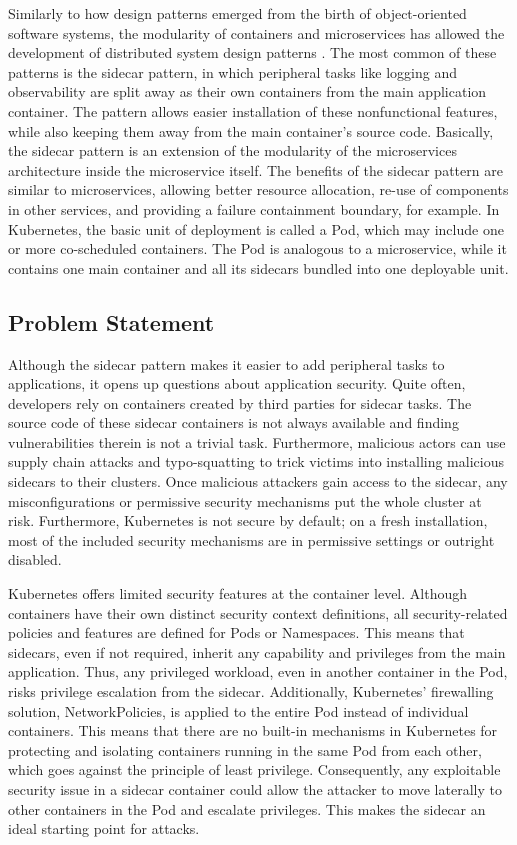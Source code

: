 \documentclass[english, 12pt, a4paper, sci, utf8, a-2b, online]{aaltothesis}
\begin{document}
Similarly to how design patterns emerged from the birth of object-oriented software systems, the modularity of containers and microservices has allowed the development of distributed system design patterns \cite{burns2016design}.
The most common of these patterns is the sidecar pattern, in which peripheral tasks like logging and observability are split away as their own containers from the main application container.
The pattern allows easier installation of these nonfunctional features, while also keeping them away from the main container's source code.
Basically, the sidecar pattern is an extension of the modularity of the microservices architecture inside the microservice itself.
The benefits of the sidecar pattern are similar to microservices, allowing better resource allocation, re-use of components in other services, and providing a failure containment boundary, for example.
In Kubernetes, the basic unit of deployment is called a Pod, which may include one or more co-scheduled containers.
The Pod is analogous to a microservice, while it contains one main container and all its sidecars bundled into one deployable unit.

\subsection{Problem Statement}

Although the sidecar pattern makes it easier to add peripheral tasks to applications, it opens up questions about application security.
Quite often, developers rely on containers created by third parties for sidecar tasks.
The source code of these sidecar containers is not always available and finding vulnerabilities therein is not a trivial task.
Furthermore, malicious actors can use supply chain attacks and typo-squatting to trick victims into installing malicious sidecars to their clusters.
Once malicious attackers gain access to the sidecar, any misconfigurations or permissive security mechanisms put the whole cluster at risk.
Furthermore, Kubernetes is not secure by default; on a fresh installation, most of the included security mechanisms are in permissive settings or outright disabled.

Kubernetes offers limited security features at the container level.
Although containers have their own distinct security context definitions, all security-related policies and features are defined for Pods or Namespaces.
This means that sidecars, even if not required, inherit any capability and privileges from the main application.
Thus, any privileged workload, even in another container in the Pod, risks privilege escalation from the sidecar.
Additionally, Kubernetes' firewalling solution, NetworkPolicies, is applied to the entire Pod instead of individual containers.
This means that there are no built-in mechanisms in Kubernetes for protecting and isolating containers running in the same Pod from each other, which goes against the principle of least privilege.
Consequently, any exploitable security issue in a sidecar container could allow the attacker to move laterally to other containers in the Pod and escalate privileges.
This makes the sidecar an ideal starting point for attacks.
\end{document}
